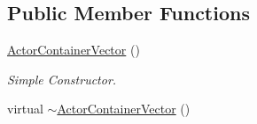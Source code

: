 \subsection*{Public Member Functions}
\begin{DoxyCompactItemize}
\item 
\hyperlink{classphys_1_1ActorContainerVector_aa7e519db8f7247deb934cd98af66ba6b}{ActorContainerVector} ()
\begin{DoxyCompactList}\small\item\em Simple Constructor. \item\end{DoxyCompactList}\item 
\hypertarget{classphys_1_1ActorContainerVector_a0bcc6e728a3ea94532e2c58248b43342}{
virtual \hyperlink{classphys_1_1ActorContainerVector_a0bcc6e728a3ea94532e2c58248b43342}{$\sim$ActorContainerVector} ()}
\label{d3/d64/classphys_1_1ActorContainerVector_a0bcc6e728a3ea94532e2c58248b43342}


\end{DoxyCompactItemize}
